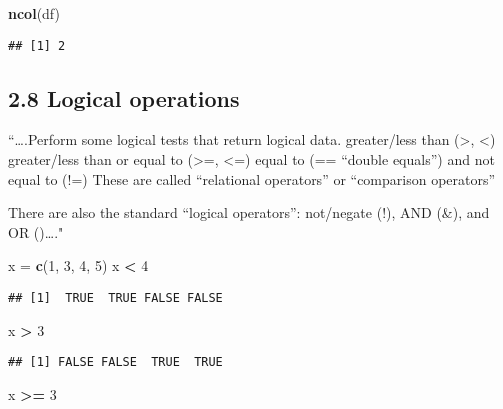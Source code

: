 \documentclass[]{article}
\newenvironment{Shaded}{\begin{snugshade}}{\end{snugshade}}
\newcommand{\DecValTok}[1]{\textcolor[rgb]{0.00,0.00,0.81}{#1}}
\newcommand{\KeywordTok}[1]{\textcolor[rgb]{0.13,0.29,0.53}{\textbf{#1}}}
\newcommand{\NormalTok}[1]{#1}
\newcommand{\OperatorTok}[1]{\textcolor[rgb]{0.81,0.36,0.00}{\textbf{#1}}}
\newcommand{\StringTok}[1]{\textcolor[rgb]{0.31,0.60,0.02}{#1}}
\begin{document}
\begin{Shaded}
\begin{Highlighting}[]
\KeywordTok{ncol}\NormalTok{(df)}
\end{Highlighting}
\end{Shaded}

\begin{verbatim}
## [1] 2
\end{verbatim}

\hypertarget{logical-operations}{%
\subsection{2.8 Logical operations}\label{logical-operations}}

``\ldots{}.Perform some logical tests that return logical data.
greater/less than (\textgreater{}, \textless{}) greater/less than or
equal to (\textgreater{}=, \textless{}=) equal to (== ``double equals'')
and not equal to (!=) These are called ``relational operators'' or
``comparison operators''

There are also the standard ``logical operators'': not/negate (!), AND
(\&), and OR (\textbar{})\ldots{}."

\begin{Shaded}
\begin{Highlighting}[]
\NormalTok{x =}\StringTok{ }\KeywordTok{c}\NormalTok{(}\DecValTok{1}\NormalTok{, }\DecValTok{3}\NormalTok{, }\DecValTok{4}\NormalTok{, }\DecValTok{5}\NormalTok{) }
\NormalTok{x }\OperatorTok{<}\StringTok{ }\DecValTok{4}
\end{Highlighting}
\end{Shaded}

\begin{verbatim}
## [1]  TRUE  TRUE FALSE FALSE
\end{verbatim}

\begin{Shaded}
\begin{Highlighting}[]
\NormalTok{x }\OperatorTok{>}\StringTok{ }\DecValTok{3}
\end{Highlighting}
\end{Shaded}

\begin{verbatim}
## [1] FALSE FALSE  TRUE  TRUE
\end{verbatim}

\begin{Shaded}
\begin{Highlighting}[]
\NormalTok{x }\OperatorTok{>=}\StringTok{ }\DecValTok{3}
\end{Highlighting}
\end{Shaded}
\end{document}
